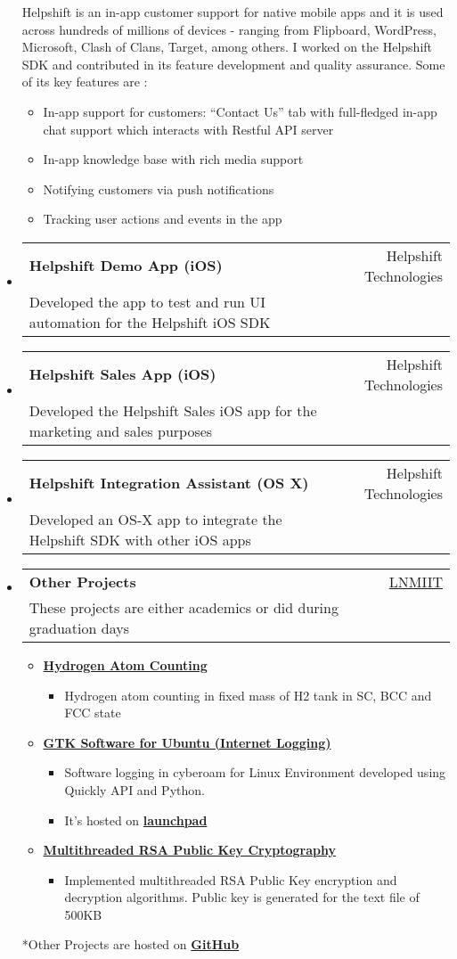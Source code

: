 \documentclass[letterpaper,11pt]{article}
\makeatletter
\newcommand{\resitem}[1]{\item #1 \vspace{-2pt}}
\newcommand{\ressubheading}[3]{
	\begin{tabular*}{6.5in}{l@{\extracolsep{\fill}}r}
			\textbf{#1} & #2\\
			{#3} \\
	\end{tabular*}\vspace{-6pt}
}
\makeatother
\begin{document}
\begin{itemize}
			{\small Helpshift is an in-app customer support for native mobile apps and it is used across hundreds of millions of devices - ranging from Flipboard, WordPress, Microsoft, Clash of Clans, Target, among others. I worked on the Helpshift SDK and contributed in its feature development and quality assurance. Some of its key features are :}
				{ \footnotesize
				\begin{itemize}
					\resitem{In-app support for customers: “Contact Us” tab with full-fledged in-app chat support which interacts with Restful API server}
					\resitem{In-app knowledge base with rich media support}
					\resitem{Notifying customers via push notifications}
					\resitem{Tracking user actions and events in the app}
				\end{itemize}
				}
	   \item
			\ressubheading{Helpshift Demo App (iOS)}{Helpshift Technologies}{Developed the app to test and run UI automation for the Helpshift iOS SDK}	
	   \item
			\ressubheading{Helpshift Sales App (iOS)}{Helpshift Technologies}{Developed the Helpshift Sales iOS app for the marketing and sales purposes}
		\item
			\ressubheading{Helpshift Integration Assistant (OS X)}{Helpshift Technologies}{Developed an OS-X app to integrate the Helpshift SDK with other iOS apps}
		\item
			\ressubheading{Other Projects}{\href{http://www.lnmiit.ac.in/}{LNMIIT}}{These projects are either academics or did during graduation days}
			{ \footnotesize
				\begin{itemize}
					\resitem{\href{https://github.com/xpd54/Hydrogen-atom-counting}{\textbf {Hydrogen Atom Counting}}}
						\begin{itemize}
							\resitem {Hydrogen atom counting in fixed mass of H2 tank in SC, BCC and FCC state}
						\end{itemize}
					\resitem{\href{https://github.com/xpd54/cyberoam-login}{\textbf {GTK Software for Ubuntu (Internet Logging)}}}
					    \begin{itemize}
							\resitem {Software logging in cyberoam for Linux Environment developed using Quickly API and Python.}
					       \resitem {It's hosted on \href{https://launchpad.net/~vickyravi17/+archive/ubuntu/xpd54-cyberoam}{\textbf{launchpad}}}
					    \end{itemize}
					\resitem{\href{https://github.com/xpd54/RsaOnMultithreading}{\textbf {Multithreaded RSA Public Key Cryptography}}}
						\begin{itemize}
							\resitem {Implemented multithreaded RSA Public Key encryption and decryption algorithms. Public key is generated for the text file of 500KB}
						\end{itemize}
				\end{itemize}
				{\tiny **Other Projects are hosted on \href{http://www.github.com/xpd54}{\textbf{GitHub}}}
			}
\end{itemize}  %
\end{document}
